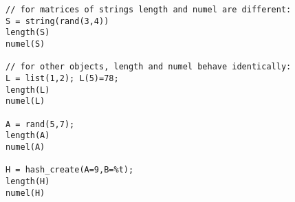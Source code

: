 \begin{examples}
\begin{Verbatim}
// for matrices of strings length and numel are different:
S = string(rand(3,4))
length(S)
numel(S)

// for other objects, length and numel behave identically:
L = list(1,2); L(5)=78;
length(L)
numel(L)

A = rand(5,7);
length(A)
numel(A)

H = hash_create(A=9,B=%t);
length(H)
numel(H)
\end{Verbatim}
\end{examples}

\begin{manseealso}
\end{manseealso}

